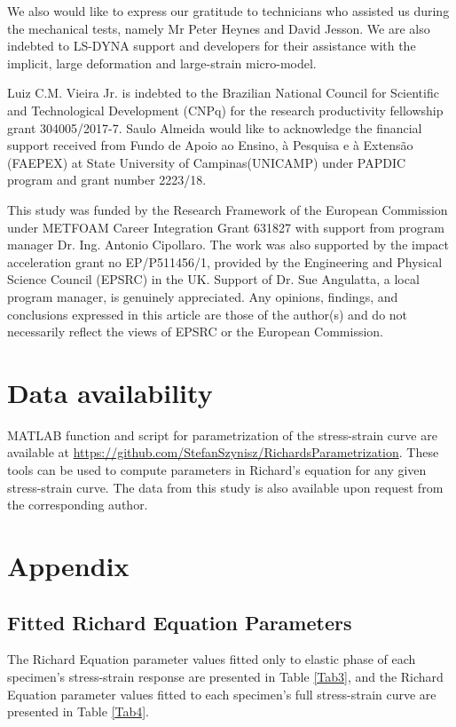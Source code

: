 \documentclass[review]{elsarticle}
\begin{document}
We also would like to express our gratitude to technicians who assisted us during the mechanical tests, namely Mr Peter Heynes and David Jesson. We are also indebted to LS-DYNA support and developers for their assistance with the implicit, large deformation and large-strain micro-model.

Luiz C.M. Vieira Jr. is indebted to the Brazilian National Council for Scientific and Technological Development (CNPq) for the research productivity fellowship grant 304005/2017-7. Saulo Almeida would like to acknowledge the financial support received from Fundo de Apoio ao Ensino, à Pesquisa e à Extensão (FAEPEX) at State University of Campinas(UNICAMP) under PAPDIC program and grant number 2223/18.

This study was funded by the Research Framework of the European Commission under METFOAM Career Integration Grant 631827 with support from program manager Dr. Ing. Antonio Cipollaro. The work was also supported by the impact acceleration grant no EP/P511456/1, provided by the Engineering and Physical Science Council (EPSRC) in the UK. Support of Dr. Sue Angulatta, a local program manager, is genuinely appreciated. Any opinions, findings, and conclusions expressed in this article are those of the author(s) and do not necessarily reflect the views of EPSRC or the European Commission.


\section*{Data availability}

MATLAB function and script for parametrization of the stress-strain curve are available at \url{https://github.com/StefanSzynisz/RichardsParametrization}. These tools can be used to compute parameters in Richard's equation for any given stress-strain curve. The data from this study is also available upon request from the corresponding author.



\section*{Appendix}

\subsection*{Fitted Richard Equation Parameters}

The Richard Equation parameter values fitted only to elastic phase of each specimen's stress-strain response are presented in Table \ref{Tab3}, and the Richard Equation parameter values fitted to each specimen's full stress-strain curve are presented in Table \ref{Tab4}.
\end{document}
